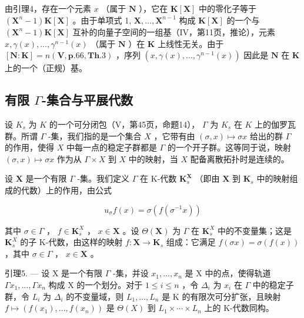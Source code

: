 由引理4，存在一个元素 \(x\) （属于 \(\mathbf{N}\) ），它在 \(\mathbf{K}[\mathbf{X}]\) 中的零化子等于 \((\mathbf{X}^n - 1)\mathbf{K}[\mathbf{X}]\) 。由于单项式 1, \(\mathbf{X}, \ldots, \mathbf{X}^{n-1}\) 构成 \(\mathbf{K}[\mathbf{X}]\) 的一个与 \((\mathbf{X}^n - 1)\mathbf{K}[\mathbf{X}]\) 互补的向量子空间的一组基（IV，第11页，推论），元素 \(x, \gamma(x), \ldots, \gamma^{n-1}(x)\) （属于 \(\mathbf{N}\) ）在 \(\mathbf{K}\) 上线性无关。由于 \([\mathbf{N}:\mathbf{K}] = n(\mathbf{V},\mathbf{p}.66,\mathbf{Th}.3)\) ，序列 \((x,\gamma(x),\ldots,\gamma^{n-1}(x))\) 因此是 \(\mathbf{N}\) 在 \(\mathbf{K}\) 上的一个（正规）基。

\subsection{\texorpdfstring{有限 \(\Gamma\)-集合与平展代数}{有限 Gamma-集合与平展代数}}

设 \(K_s\) 为 \(K\) 的一个可分闭包（V，第45页，命题14）， \(\Gamma\) 为 \(K_s\) 在 \(K\) 上的伽罗瓦群。所谓 \(\Gamma\) -集，我们指的是一个集合 \(X\) ，它带有由 \((\sigma, x) \mapsto \sigma x\) 给出的群 \(\Gamma\) 的作用，使得 \(X\) 中每一点的稳定子群都是 \(\Gamma\) 的一个开子群。这等同于说，映射 \((\sigma, x) \mapsto \sigma x\) 作为从 \(\Gamma \times X\) 到 \(X\) 中的映射，当 \(X\) 配备离散拓扑时是连续的。

设 \(\mathbf{X}\) 是一个有限 \(\Gamma\) -集。我们定义 \(\Gamma\) 在 K-代数 \(\mathbf{K}_s^{\mathbf{X}}\) （即由 \(\mathbf{X}\) 到 \(\mathbf{K}_s\) 中的映射组成的代数）上的作用，由公式

\[
u _ {\sigma} f (x) = \sigma \left(f \left(\sigma^ {- 1} x\right)\right)\tag{12}
\]

其中 \(\sigma \in \Gamma\) ， \(f \in \mathbf{K}_s^X\) ， \(x \in \mathbf{X}\) 。设 \(\Theta(\mathbf{X})\) 为 \(\Gamma\) 在 \(\mathbf{K}_s^X\) 中的不变量集；这是 \(\mathbf{K}_s^X\) 的子 K-代数，由这样的映射 \(f: \mathbf{X} \to \mathbf{K}_s\) 组成：它满足 \(f(\sigma x) = \sigma(f(x))\) ，其中 \(\sigma \in \Gamma\) ， \(x \in \mathbf{X}\) 。

引理5. --- 设 X 是一个有限 \(\Gamma\) -集，并设 \(x_1, \ldots, x_n\) 是 X 中的点，使得轨道 \(\Gamma x_1, \ldots, \Gamma x_n\) 构成 X 的一个划分。对于 \(1 \leqslant i \leqslant n\) ，令 \(\Delta_i\) 为 \(x_i\) 在 \(\Gamma\) 中的稳定子群，令 \(L_i\) 为 \(\Delta_i\) 的不变量域，则 \(L_1, \ldots, L_n\) 是 K 的有限次可分扩张，且映射 \(f \mapsto (f(x_1), \ldots, f(x_n))\) 是 \(\Theta(X)\) 到 \(L_1 \times \cdots \times L_n\) 上的 K-代数同构。

